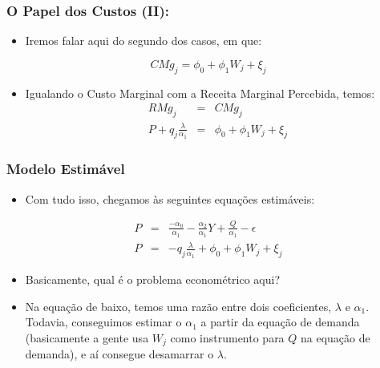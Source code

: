 \documentclass{beamer}
\begin{document}
\begin{frame}\frametitle{O Papel dos Custos (II):}

\begin{itemize}
\item Iremos falar aqui do segundo dos casos, em que:
\end{itemize}
\[
CMg_{j}=\phi_{0}+\phi_{1}W_{j}+\xi_{j}
\]
\begin{itemize}
\item Igualando o Custo Marginal com a Receita Marginal Percebida,
temos:
\begin{eqnarray*}
RMg_{j} & = & CMg_{j}\\
P+q_{j}\frac{\lambda}{\alpha_{1}} & = & \phi_{0}+\phi_{1}W_{j}+\xi_{j}
\end{eqnarray*}
\end{itemize}
\end{frame}

\begin{frame}\frametitle{Modelo Estimável}

\begin{itemize}
\item Com tudo isso, chegamos às seguintes equações estimáveis:
\end{itemize}
\begin{eqnarray*}
P & = & \frac{-\alpha_{0}}{\alpha_{1}}-\frac{\alpha_{2}}{\alpha_{1}}Y+\frac{Q}{\alpha_{1}}-\epsilon\\
P & = & -q_{j}\frac{\lambda}{\alpha_{1}}+\phi_{0}+\phi_{1}W_{j}+\xi_{j}
\end{eqnarray*}

\begin{itemize}
\item Basicamente, qual é o problema econométrico aqui? 
\item Na equação de baixo, temos uma razão entre dois coeficientes, $\lambda$
e $\alpha_{1}$. Todavia, conseguimos estimar o $\alpha_{1}$ a partir
da equação de demanda (basicamente a gente usa $W_{j}$ como instrumento
para $Q$ na equação de demanda), e aí consegue desamarrar o $\lambda$.
\end{itemize}
\end{frame}
\end{document}
